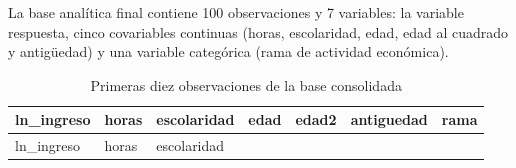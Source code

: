 \documentclass[
  spanish,
  letterpaper,
  DIV=11,
  numbers=noendperiod]{scrartcl}
\begin{document}
La base analítica final contiene 100 observaciones y 7 variables: la
variable respuesta, cinco covariables continuas (horas, escolaridad,
edad, edad al cuadrado y antigüedad) y una variable categórica (rama de
actividad económica).

\begin{longtable}[]{@{}
  >{\raggedleft\arraybackslash}p{}
  >{\raggedleft\arraybackslash}p{}
  >{\raggedleft\arraybackslash}p{}
  >{\raggedleft\arraybackslash}p{}
  >{\raggedleft\arraybackslash}p{}
  >{\raggedleft\arraybackslash}p{}
  >{\raggedright\arraybackslash}p{}@{}}
\caption{Primeras diez observaciones de la base
consolidada}\tabularnewline
\toprule\noalign{}
\begin{minipage}[b]{\linewidth}\raggedleft
ln\_ingreso
\end{minipage} & \begin{minipage}[b]{\linewidth}\raggedleft
horas
\end{minipage} & \begin{minipage}[b]{\linewidth}\raggedleft
escolaridad
\end{minipage} & \begin{minipage}[b]{\linewidth}\raggedleft
edad
\end{minipage} & \begin{minipage}[b]{\linewidth}\raggedleft
edad2
\end{minipage} & \begin{minipage}[b]{\linewidth}\raggedleft
antiguedad
\end{minipage} & \begin{minipage}[b]{\linewidth}\raggedright
rama
\end{minipage} \\
\midrule\noalign{}
\endfirsthead
\toprule\noalign{}
\begin{minipage}[b]{\linewidth}\raggedleft
ln\_ingreso
\end{minipage} & \begin{minipage}[b]{\linewidth}\raggedleft
horas
\end{minipage} & \begin{minipage}[b]{\linewidth}\raggedleft
escolaridad
\end{minipage} & \begin{minipage}[b]{\linewidth}\raggedleft

\end{minipage}
\end{longtable}
\end{document}
